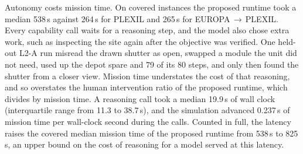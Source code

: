 Autonomy costs mission time. On covered instances the proposed runtime took a median 538\,s against 264\,s for PLEXIL
and 265\,s for EUROPA\,$\rightarrow$\,PLEXIL. Every capability call waits for a reasoning step, and the model also
chose extra work, such as inspecting the site again after the objective was verified. One held-out L2-A run misread
the drawn shutter as open, swapped a module the unit did not need, used up the depot spare and 79 of its 80 steps, and
only then found the shutter from a closer view. Mission time understates the
cost of that reasoning, and so overstates the human intervention ratio of the proposed runtime, which divides by
mission time. A reasoning call took a median 19.9\,s of wall clock (interquartile range from 11.3 to 38.7\,s), and the
simulation advanced 0.237\,s of mission time per wall-clock second during the calls. Counted in full, the latency
raises the covered median mission time of the proposed runtime from 538\,s to 825\,s, an upper bound on the cost of
reasoning for a model served at this latency.

\begin{table}[t]
  \centering
  \caption{Human independence in Experiment I (NIST ALFUS). HIR: human intervention ratio. Requests: authorization /
  new procedure / information. Highest level: runs by the most human-directed ALFUS level mission control acted at
  (none: no answer directed the robot). Re-authoring: runs that needed a new procedure from the ground. Idle: fraction
  of mission time waiting on the ground. Stretch: longest autonomous stretch. HIR, idle and stretch: median over runs
  [percentile bootstrap 95\% interval].}
  \label{tab:independence}
  \small
  \resizebox{\textwidth}{!}{}
\end{table}

